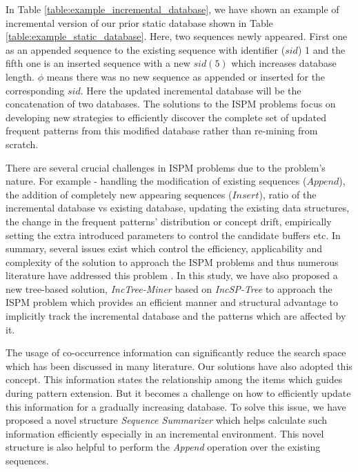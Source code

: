 In Table \ref{table:example_incremental_database}, we have shown an example of incremental version of our prior static database shown in Table \ref{table:example_static_database}. Here, two sequences newly appeared. First one as an appended sequence to the existing sequence with identifier ($sid$) 1 and the fifth one is an inserted sequence with a new $sid(5)$ which increases database length. $\phi$ means there was no new sequence as appended or inserted for the corresponding $sid$. Here the updated incremental database will be the concatenation of two databases. The solutions to the ISPM problems focus on developing new strategies to efficiently discover the complete set of updated frequent patterns from this modified database rather than re-mining from scratch.

There are several crucial challenges in ISPM problems due to the problem's nature. For example - handling the modification of existing sequences ($Append$), the addition of completely new appearing sequences ($Insert$), ratio of the incremental database vs existing database, updating the existing data structures, the change in the frequent patterns' distribution or concept drift, empirically setting the extra introduced parameters to control the candidate buffers
\cite{cheng2004incspan,lin2015incrementally} etc. In summary, several issues exist which control the efficiency, applicability and complexity of the solution to approach the ISPM problems and thus numerous literature have addressed this problem \cite{lin2004incremental,cheng2004incspan,liu2012incremental,lin2015incrementally,saleti2019mapreduce}. In this study, we have also proposed a new tree-based solution, \textit{IncTree-Miner} based on \textit{IncSP-Tree} to approach the ISPM problem which provides an efficient manner and structural advantage to implicitly track the incremental database and the patterns which are affected by it.


The usage of co-occurrence information can significantly reduce the search space which has been discussed in many literature\cite{fournier2014fast,fournier2017survey,saleti2019mapreduce}. Our solutions have also adopted this concept. This information states the relationship among the items which guides during pattern extension. But it becomes a challenge on how to efficiently update this information for a gradually increasing database. To solve this issue, we have proposed a novel structure \textit{Sequence Summarizer} which helps calculate such information efficiently especially in an incremental environment. This novel structure is also helpful to perform the \textit{Append} operation over the existing sequences.

